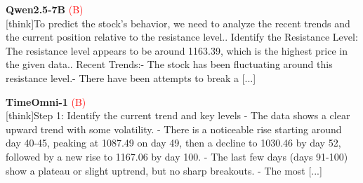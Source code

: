 \noindent
\begin{minipage}[t]{0.28\textwidth}
\colorbox{red!8}{\parbox{\dimexpr\textwidth-2\fboxsep}{
\textbf{Qwen2.5-7B} \textcolor{red}{(B)} \\[2pt]
\tiny
[think]\newline To predict the stock's behavior, we need to analyze the recent trends and the current position relative to the resistance level.. Identify the Resistance Level: The resistance level appears to be around 1163.39, which is the highest price in the given data.. Recent Trends:\newline    - The stock has been fluctuating around this resistance level.\newline    - There have been attempts to break a [...]
}}
\end{minipage}
\hfill
\begin{minipage}[t]{0.28\textwidth}
\colorbox{red!8}{\parbox{\dimexpr\textwidth-2\fboxsep}{
\textbf{TimeOmni-1} \textcolor{red}{(B)} \\[2pt]
\tiny
[think]\newline Step 1: Identify the current trend and key levels  \newline - The data shows a clear upward trend with some volatility.  \newline - There is a noticeable rise starting around day 40-45, peaking at  1087.49 on day 49, then a decline to  1030.46 by day 52, followed by a new rise to  1167.06 by day 100.  \newline - The last few days (days 91-100) show a plateau or slight uptrend, but no sharp breakouts.  \newline - The most [...]
}}
\end{minipage}
\hfill
